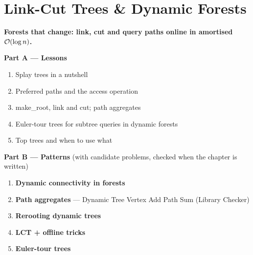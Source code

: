\chapter{Link-Cut Trees \& Dynamic Forests}
\label{ch:link_cut}

\begin{tcolorbox}[enhanced, colback=white, colframe=secondaryblue, boxrule=1pt, arc=2mm]
\textbf{\large\textcolor{primaryblue}{Forests that change: link, cut and query paths online in amortised $\mathcal{O}(\log n)$.}}
\end{tcolorbox}


\begin{plannedbox}
\textbf{Part A --- Lessons}
\begin{enumerate}[leftmargin=*, label=\textbf{A\arabic*.}, itemsep=1pt]
    \item Splay trees in a nutshell
    \item Preferred paths and the access operation
    \item make\_root, link and cut; path aggregates
    \item Euler-tour trees for subtree queries in dynamic forests
    \item Top trees and when to use what
\end{enumerate}
\textbf{Part B --- Patterns} (with candidate problems, checked when the chapter is written)
\begin{enumerate}[leftmargin=*, label=\textbf{P\arabic*.}, itemsep=1pt]
    \item \textbf{Dynamic connectivity in forests}
    \item \textbf{Path aggregates} --- Dynamic Tree Vertex Add Path Sum {\small\color{darkgray}(Library Checker)}
    \item \textbf{Rerooting dynamic trees}
    \item \textbf{LCT + offline tricks}
    \item \textbf{Euler-tour trees}
\end{enumerate}
\end{plannedbox}
